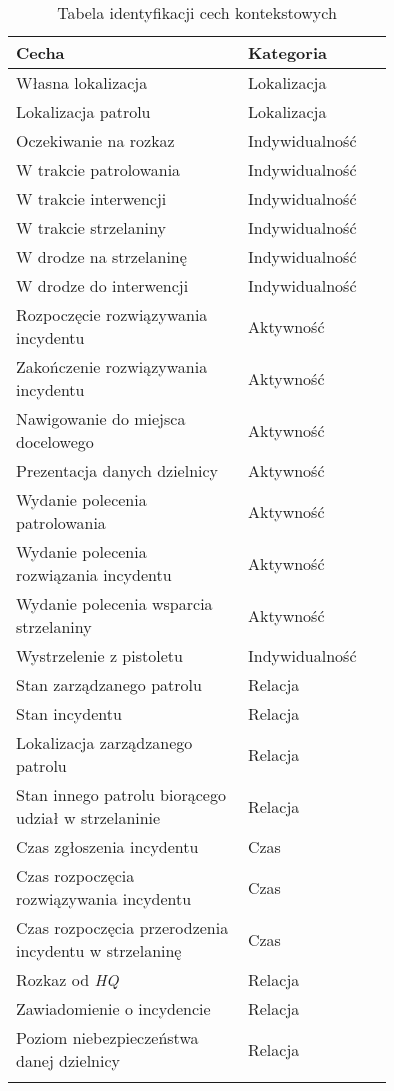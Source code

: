 \begin{longtable}{|p{0.5\linewidth}|p{0.25\linewidth}|}
    \hline
     Cecha & Kategoria \\
     \hline
     \hline
     Własna lokalizacja & Lokalizacja \\
     \hline
     Lokalizacja patrolu & Lokalizacja \\
     \hline
     Oczekiwanie na rozkaz & Indywidualność \\
     \hline
     W trakcie patrolowania & Indywidualność \\
     \hline
     W trakcie interwencji & Indywidualność \\
     \hline
     W trakcie strzelaniny & Indywidualność \\
     \hline
     W drodze na strzelaninę & Indywidualność \\
     \hline
     W drodze do interwencji & Indywidualność \\
     \hline
     Rozpoczęcie rozwiązywania incydentu & Aktywność \\
     \hline
     Zakończenie rozwiązywania incydentu & Aktywność \\
     \hline
     Nawigowanie do miejsca docelowego & Aktywność \\
     \hline
     Prezentacja danych dzielnicy & Aktywność \\
     \hline
     Wydanie polecenia patrolowania & Aktywność \\
     \hline
     Wydanie polecenia rozwiązania incydentu & Aktywność \\
     \hline
     Wydanie polecenia wsparcia strzelaniny & Aktywność \\
     \hline
     Wystrzelenie z pistoletu & Indywidualność \\
     \hline
     Stan zarządzanego patrolu & Relacja \\
     \hline
     Stan incydentu & Relacja \\
     \hline
     Lokalizacja zarządzanego patrolu & Relacja \\
     \hline
     Stan innego patrolu biorącego udział w strzelaninie & Relacja \\
     \hline
     Czas zgłoszenia incydentu & Czas \\
     \hline
     Czas rozpoczęcia rozwiązywania incydentu & Czas \\
     \hline
      Czas rozpoczęcia przerodzenia incydentu w strzelaninę & Czas \\
     \hline
      Rozkaz od \emph{HQ} & Relacja \\
     \hline
     Zawiadomienie o incydencie & Relacja \\
     \hline
     Poziom niebezpieczeństwa danej dzielnicy & Relacja \\
     \hline
\caption{Tabela identyfikacji cech kontekstowych}
\label{tab:agentsFeaturesCategorization}
\end{longtable}

